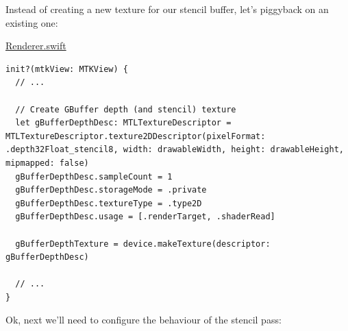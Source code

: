 \documentclass[11pt]{article}
\begin{document}
Instead of creating a new texture for our stencil buffer, let's piggyback on an
existing one:

\uline{Renderer.swift}
\begin{verbatim}
init?(mtkView: MTKView) {
  // ...

  // Create GBuffer depth (and stencil) texture
  let gBufferDepthDesc: MTLTextureDescriptor = MTLTextureDescriptor.texture2DDescriptor(pixelFormat: .depth32Float_stencil8, width: drawableWidth, height: drawableHeight, mipmapped: false)
  gBufferDepthDesc.sampleCount = 1
  gBufferDepthDesc.storageMode = .private
  gBufferDepthDesc.textureType = .type2D
  gBufferDepthDesc.usage = [.renderTarget, .shaderRead]

  gBufferDepthTexture = device.makeTexture(descriptor: gBufferDepthDesc)

  // ...
}
\end{verbatim}

Ok, next we'll need to configure the behaviour of the stencil pass:
\end{document}
